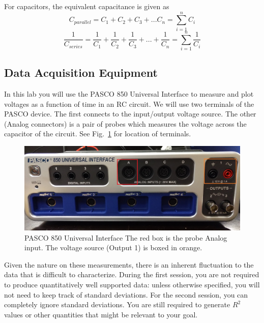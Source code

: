 \documentclass[12pt]{report}
\begin{document}
For capacitors, the equivalent capacitance is given as
\begin{equation}
C_{parallel} = C_1 + C_2 + C_3 + ... C_n = \displaystyle \sum_{i=1}^n C_i
\end{equation}
\begin{equation}
\frac{1}{C_{series}} =  \frac{1}{C_1} + \frac{1}{C_2} + \frac{1}{C_3} + ... + \frac{1}{C_n} = \displaystyle  \sum_{i=1}^n \frac{1}{C_i}
\end{equation}

\subsection{Data Acquisition  Equipment} \label{Sect:lab2-equipment}
In this lab you will use the PASCO 850 Universal Interface to measure and plot voltages as a function of time in an RC circuit. 
We will use two terminals of the PASCO device. The first connects to the input/output voltage source. 
The other (Analog connectors) is a pair of probes which measures the voltage across the capacitor of the circuit. 
See Fig.~\ref{Fig:lab2-PASCO} for location of terminals.

\begin{figure}[h]
\centering
\includegraphics[width=0.8\linewidth]{lab2-PASCO}
\caption{PASCO 850 Universal Interface The red box is the probe Analog input. The voltage source (Output 1) is boxed in orange.}
\label{Fig:lab2-PASCO}
\end{figure}

Given the nature on these measurements, there is an inherent fluctuation to the data that is difficult to characterize. 
During the first session, you are not required to produce quantitatively well supported data: unless otherwise specified, you will not need to keep track of standard deviations.
For the second session, you can completely ignore standard deviations. You are still required to generate $R^2$ values or other quantities that might be relevant to your goal. 
\end{document}

